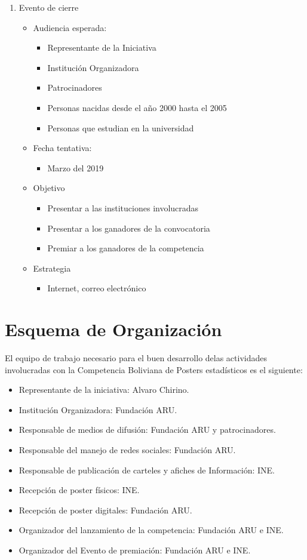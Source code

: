 \documentclass{article}
\begin{document}
\begin{enumerate}
\item Evento de cierre
\begin{itemize}
\item Audiencia esperada:
\begin{itemize}
\item Representante de la Iniciativa
\item Institución Organizadora
\item Patrocinadores
\item Personas nacidas desde el año 2000 hasta el 2005
\item Personas que estudian en la universidad
\end{itemize}
\item Fecha tentativa:
\begin{itemize}
\item Marzo del 2019
\end{itemize}
\item Objetivo
\begin{itemize}
\item Presentar a las instituciones involucradas
\item Presentar a los ganadores de la convocatoria
\item Premiar a los ganadores de la competencia
\end{itemize}
\item Estrategia
\begin{itemize}
\item Internet, correo electrónico
\end{itemize}
\end{itemize}
\end{enumerate}

\section{Esquema de Organización}

El equipo de trabajo necesario para el buen desarrollo delas actividades involucradas con la Competencia Boliviana de Posters estadísticos es el siguiente: 

\begin{itemize}
\item Representante de la iniciativa: Alvaro Chirino.  
\item Institución Organizadora: Fundación ARU.
\item Responsable de medios de difusión:  Fundación ARU y patrocinadores. 
\item Responsable del manejo de redes sociales: Fundación ARU.
\item Responsable de publicación de carteles y afiches de Información: INE.
\item Recepción de poster físicos: INE.
\item Recepción de poster digitales: Fundación ARU.
\item Organizador del lanzamiento de la competencia: Fundación ARU e INE.
\item Organizador del Evento de premiación: Fundación ARU e INE.
\end{itemize}
\end{document}
